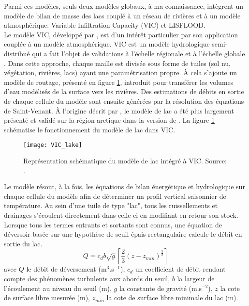 Parmi ces modèles, seuls deux modèles globaux, à ma connaissance, intègrent un modèle de bilan de masse des lacs couplé à un réseau de rivières et à un modèle atmosphérique: Variable Infiltration Capacity (VIC) et LISFLOOD. \\

Le modèle VIC, développé par \citet{liang1996}, est d'un intérêt particulier par son application couplée à un modèle atmosphérique. VIC est un modèle hydrologique semi-distribué qui a fait l’objet de validations à l’échelle régionale \citep[avec une résolution de 1/8°:][]{maurer2002} et à l’échelle globale \citep[avec une résolution de 2°:][]{nijssen2001}.  Dans cette approche, chaque maille est divisée sous forme de tuiles (sol nu, végétation, rivières, lacs) ayant une paramétrisation propre. À cela s'ajoute un modèle de routage, présenté en figure \ref{vic_lake}, introduit pour transférer les volumes d’eau modélisés de la surface vers les rivières. Des estimations de débits en sortie de chaque cellule du modèle sont ensuite générées par la résolution des équations de Saint-Venant. À l'origine décrit par \citet{cherkauer2003}, le modèle de lac a été plus largement présenté et validé sur la région arctique dans la version de \citet{bowling2010}. La figure \ref{vic_lake} schématise le fonctionnement du modèle de lac dans VIC.\\

\begin{figure}[h!]
 \centerline{\texttt{[image: VIC\_lake]}}
 \caption{Représentation schématique du modèle de lac intégré à VIC. Source: \citet{cherkauer2003}.}
 \label{vic_lake}
\end{figure}
\clearpage
Le modèle résout, à la fois, les équations de bilan énergétique et hydrologique sur chaque cellule du modèle afin de déterminer un profil vertical saisonnier de température. Au sein d'une tuile de type "lac", tous les ruissellements et drainages s'écoulent directement dans celle-ci en modifiant en retour son stock. Lorsque tous les termes entrants et sortants sont connus, une équation de déversoir basée sur une hypothèse de seuil épais rectangulaire calcule le débit en sortie du lac. 
\begin{equation}
Q= c_{d}b\sqrt{g} [\frac{2}{3} (z-z_{min})^\frac{3}{2}]
\end{equation}
avec $Q$ le débit de déversement (m$^{3}$.s$^{-1}$), $c_{d}$ un coefficient de débit rendant compte des phénomènes turbulents aux abords du seuil, $b$ la largeur de l'écoulement au niveau du seuil (m), $g$ la constante de gravité (m.s$^{-2}$), $z$ la cote de surface libre mesurée (m), $z_{min}$ la cote de surface libre minimale du lac (m).\\


